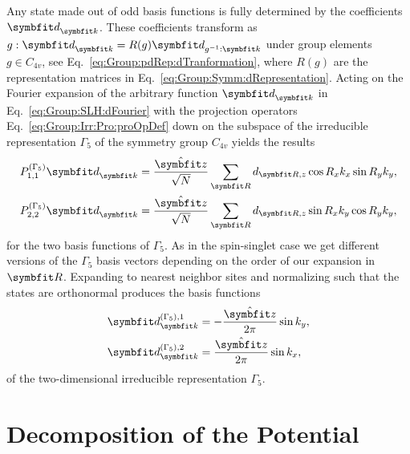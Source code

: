 Any state made out of odd basis functions is fully determined by the coefficients $\v{d}_\v{k}$. These coefficients transform as $g:\v{d}_\v{k} = R(g)\v{d}_{g^{-1}:\v{k}}$
under group elements $g\in C_{4v}$, see Eq.~\eqref{eq:Group:pdRep:dTranformation}, where $R(g)$ are the representation matrices in Eq.~\eqref{eq:Group:Symm:dRepresentation}.
Acting on the Fourier expansion of the arbitrary function $\v{d}_\v{k}$ in Eq.~\eqref{eq:Group:SLH:dFourier} with the projection operators Eq.~\eqref{eq:Group:Irr:Pro:proOpDef}
down on the subspace of the irreducible representation $\Gamma_5$ of the symmetry group $C_{4v}$ yields the results
\begin{subequations}
    \label{eq:Group:SLH:odd:projections}
    \begin{align}
        \label{eq:Group:SLH:odd:projections:1}
        P_{1,1}^{(\Gamma_5)}\v{d}_\v{k} &= \frac{\hat{\v{z}}}{\sqrt{N}}\sum_\v{R}d_{\v{R},z}\cos R_xk_x \sin R_yk_y,\\
        \label{eq:Group:SLH:odd:projections:2}
        P_{2,2}^{(\Gamma_5)}\v{d}_\v{k} &= \frac{\hat{\v{z}}}{\sqrt{N}}\sum_\v{R}d_{\v{R},z}\sin R_xk_y\cos R_yk_y,
    \end{align}
\end{subequations}
for the two basis functions of $\Gamma_5$. As in the spin-singlet case we get different versions of the $\Gamma_5$ basis vectors depending on the order of our expansion in $\v{R}$.
Expanding to nearest neighbor sites and normalizing such that the states are orthonormal produces the basis functions
\begin{subequations}
    \label{eq:Group:SLH:odd:G5basis}
    \begin{align}
        \label{eq:Group:SLH:odd:G5basis:1}
        \v{d}^{(\Gamma_5),1}_\v{k} &= -\frac{\hat{\v{z}}}{2\pi}\sin k_y,\\
        \label{eq:Group:SLH:odd:G5basis:2}
        \v{d}^{(\Gamma_5),2}_\v{k} &= \frac{\hat{\v{z}}}{2\pi}\sin k_x,
    \end{align}
\end{subequations}
of the two-dimensional irreducible representation $\Gamma_5$.

\section{Decomposition of the Potential}
\label{sec:Group:Potential}

